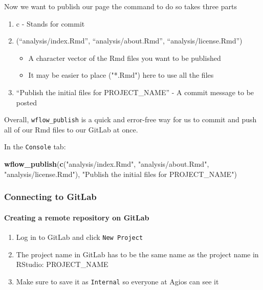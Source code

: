 \documentclass[openany]{article}
\newenvironment{Shaded}{\begin{snugshade}}{\end{snugshade}}
\newcommand{\KeywordTok}[1]{\textcolor[rgb]{0.13,0.29,0.53}{\textbf{#1}}}
\newcommand{\NormalTok}[1]{#1}
\newcommand{\StringTok}[1]{\textcolor[rgb]{0.31,0.60,0.02}{#1}}
\providecommand{\tightlist}{%
  \setlength{\itemsep}{0pt}\setlength{\parskip}{0pt}}
\let\oldparagraph\paragraph
\renewcommand{\paragraph}[1]{\oldparagraph{#1}\mbox{}}
\begin{document}
Now we want to publish our page the command to do so takes three parts

\begin{enumerate}
\def\labelenumi{\arabic{enumi}.}
\tightlist
\item
  c - Stands for commit
\item
  (``analysis/index.Rmd'', ``analysis/about.Rmd'', ``analysis/license.Rmd'')

  \begin{itemize}
  \tightlist
  \item
    A character vector of the Rmd files you want to be published
  \item
    It may be easier to place ("*.Rmd") here to use all the files
  \end{itemize}
\item
  ``Publish the initial files for PROJECT\_NAME'' - A commit message to be posted
\end{enumerate}

Overall, \texttt{wflow\_publish} is a quick and error-free way for us to commit and push all of our Rmd files to our GitLab at once.

In the \texttt{Console} tab:

\begin{Shaded}
\begin{Highlighting}[]
\KeywordTok{wflow_publish}\NormalTok{(}\KeywordTok{c}\NormalTok{(}\StringTok{"analysis/index.Rmd"}\NormalTok{, }\StringTok{"analysis/about.Rmd"}\NormalTok{, }\StringTok{"analysis/license.Rmd"}\NormalTok{), }\StringTok{"Publish the initial files for PROJECT_NAME"}\NormalTok{)}
\end{Highlighting}
\end{Shaded}

\hypertarget{connecting-to-gitlab-1}{%
\subsubsection{Connecting to GitLab}\label{connecting-to-gitlab-1}}

\hypertarget{creating-a-remote-repository-on-gitlab}{%
\paragraph{Creating a remote repository on GitLab}\label{creating-a-remote-repository-on-gitlab}}

\begin{enumerate}
\def\labelenumi{\arabic{enumi}.}
\tightlist
\item
  Log in to GitLab and click \texttt{New\ Project}
\item
  The project name in GitLab has to be the same name as the project name in RStudio: PROJECT\_NAME
\item
  Make sure to save it as \texttt{Internal} so everyone at Agios can see it
\end{enumerate}
\end{document}
